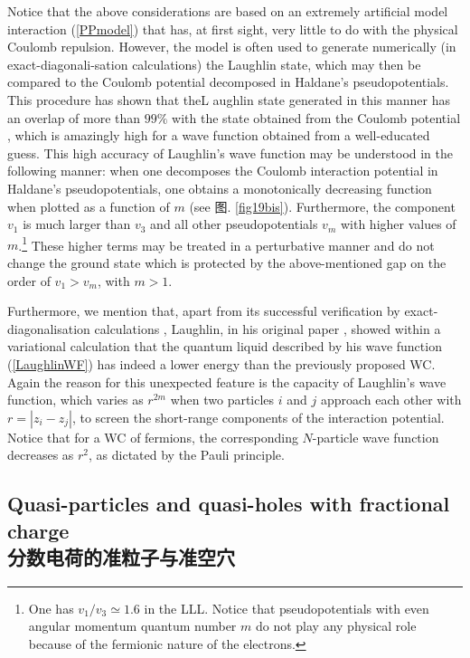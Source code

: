 \documentclass[10pt]{book}
\begin{document}
Notice that the above considerations are based on an extremely artificial model interaction (\ref{PPmodel}) that has, at
first sight, very little to do with the physical Coulomb repulsion. However, the model is often used to generate numerically
(in exact-diagonali-sation calculations) the Laughlin state, which may then be compared to the Coulomb potential decomposed in
Haldane's pseudopotentials. This procedure has shown that theL aughlin state generated in this manner has an overlap of more than
$99\%$ with the state obtained from the Coulomb potential \cite{HaldRez,FOC}, which is amazingly high for a wave function
obtained from a well-educated guess. This  high accuracy of Laughlin's wave function may be understood in the
following manner: when one decomposes the Coulomb interaction potential in Haldane's pseudopotentials, one obtains a
monotonically decreasing function when plotted as a function of $m$ (see 图. \ref{fig19bis}).
Furthermore, the component $v_1$ is much larger than
$v_3$ and all other pseudopotentials $v_m$ with higher values of $m$.\footnote{One has $v_1/v_3\simeq 1.6$ in the LLL. Notice that
pseudopotentials with even angular momentum quantum number $m$ do not play any physical role because of the fermionic
nature of the electrons.} These higher terms may be treated in a perturbative manner and do not change the ground state which
is protected by the above-mentioned gap on the order of $v_1>v_m$, with $m>1$.

Furthermore, we mention that, apart from its successful verification by exact-diagonalisation calculations \cite{HaldRez,FOC},
Laughlin, in his original paper \cite{laughlin}, showed within a variational calculation that the quantum liquid described
by his wave function (\ref{LaughlinWF}) has indeed a lower energy than the previously proposed WC. Again the reason for this 
unexpected feature is the capacity of Laughlin's wave function, which varies as $r^{2m}$ when two particles $i$ and $j$ 
approach each other with $r=|z_i - z_j|$, to screen the short-range components of the interaction potential. Notice that for 
a WC of fermions, the corresponding $N$-particle wave function decreases as $r^2$, as dictated by the Pauli principle.




\subsection[分数电荷的准粒子与准空穴]{Quasi-particles and quasi-holes with fractional charge\\\bf 分数电荷的准粒子与准空穴}
\end{document}
